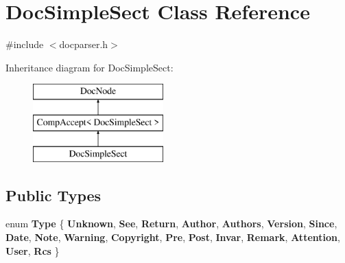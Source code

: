 \hypertarget{class_doc_simple_sect}{}\section{Doc\+Simple\+Sect Class Reference}
\label{class_doc_simple_sect}


{\ttfamily \#include $<$docparser.\+h$>$}

Inheritance diagram for Doc\+Simple\+Sect\+:\begin{figure}[H]
\begin{center}
\leavevmode
\includegraphics[height=3.000000cm]{class_doc_simple_sect}
\end{center}
\end{figure}
\subsection*{Public Types}
\begin{DoxyCompactItemize}
\item 
\mbox{\label{class_doc_simple_sect_a3b9f9dd4952f3d819b347f74a6769a9b}} 
enum {\bfseries Type} \{ \newline
{\bfseries Unknown}, 
{\bfseries See}, 
{\bfseries Return}, 
{\bfseries Author}, 
\newline
{\bfseries Authors}, 
{\bfseries Version}, 
{\bfseries Since}, 
{\bfseries Date}, 
\newline
{\bfseries Note}, 
{\bfseries Warning}, 
{\bfseries Copyright}, 
{\bfseries Pre}, 
\newline
{\bfseries Post}, 
{\bfseries Invar}, 
{\bfseries Remark}, 
{\bfseries Attention}, 
\newline
{\bfseries User}, 
{\bfseries Rcs}
 \}
\end{DoxyCompactItemize}
